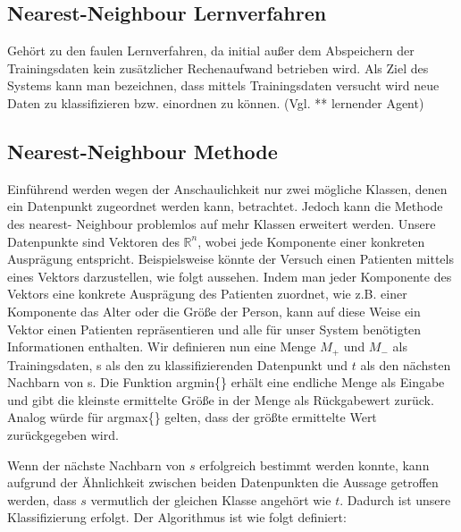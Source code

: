 \documentclass[a4paper]{scrartcl}
\begin{document}
\begin{multicols}{2}
                    \section{Nearest-Neighbour Lernverfahren}
                        Gehört zu den faulen Lernverfahren, da initial außer dem Abspeichern der Trainingsdaten kein zusätzlicher Rechenaufwand betrieben wird. Als Ziel des Systems kann man bezeichnen, dass mittels Trainingsdaten versucht wird neue Daten zu klassifizieren bzw. einordnen zu können. (Vgl. ** lernender Agent)
                        
                    \subsection{Nearest-Neighbour Methode}
                        Einführend werden wegen der Anschaulichkeit nur zwei mögliche Klassen, denen ein Datenpunkt zugeordnet werden kann, betrachtet. Jedoch kann die Methode des nearest- Neighbour problemlos auf mehr Klassen erweitert werden.
                        Unsere Datenpunkte sind Vektoren des $\mathbb{R}^n$, wobei jede Komponente einer konkreten Ausprägung entspricht. 
                        Beispielsweise könnte der Versuch einen Patienten mittels eines Vektors darzustellen, wie folgt aussehen. Indem man jeder Komponente des Vektors eine konkrete Ausprägung des Patienten zuordnet, wie z.B. einer Komponente das Alter oder die Größe der Person, kann auf diese Weise ein Vektor einen Patienten repräsentieren und alle für unser System benötigten Informationen enthalten.
                        Wir definieren nun eine Menge $M_+$ und $M_-$ als Trainingsdaten, s als den zu klassifizierenden Datenpunkt und $t$ als den nächsten Nachbarn von s. Die Funktion argmin\{\} erhält eine endliche Menge als Eingabe und gibt die kleinste ermittelte Größe in der Menge als Rückgabewert zurück. Analog würde für argmax\{\} gelten, dass der größte ermittelte Wert zurückgegeben wird.
                        
                        Wenn der nächste Nachbarn von $s$ erfolgreich bestimmt werden konnte, kann aufgrund der Ähnlichkeit zwischen beiden Datenpunkten die Aussage getroffen werden, dass $s$ vermutlich der gleichen Klasse angehört wie $t$. Dadurch ist unsere Klassifizierung erfolgt.
                        Der Algorithmus ist wie folgt definiert:
                        \begin{algorithm}[H]
                               {
                                  \KwRet{-}\;
                                 }
                                 

\end{algorithm}
\end{multicols}
\end{document}
